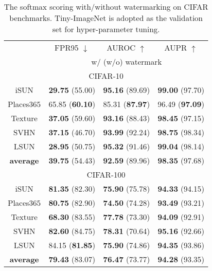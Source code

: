 \documentclass{article}
\begin{document}
\begin{table}[t]
\centering
\caption{The softmax scoring with/without watermarking on CIFAR benchmarks. Tiny-ImageNet is adopted as the validation set for hyper-parameter tuning.} \label{tablast}
\vspace{5pt}
\scriptsize
{
\begin{tabular}{c|ccc}
\toprule[1.5pt]
                   & FPR95 $\downarrow$     & AUROC $\uparrow$       & AUPR $\uparrow$      \\
                   \cline{2-4} 
\multirow{-2}{*}{} & \multicolumn{3}{c}{w/ (w/o) watermark} \\
\midrule[0.6pt]
\multicolumn{4}{c}{\cellcolor{greyL}CIFAR-10} \\
\midrule[0.6pt]
iSUN               & \textbf{29.75} (55.00)& \textbf{95.16} (89.69)& \textbf{99.00} (97.70)\\
Places$365$        & 65.85 (\textbf{60.10})& 85.31 (\textbf{87.97})& 96.49 (\textbf{97.09})\\
Texture            & \textbf{37.05} (59.60)& \textbf{93.16} (88.43)& \textbf{98.45} (97.15)\\
SVHN               & \textbf{37.15} (46.70)& \textbf{93.99} (92.24)& \textbf{98.75} (98.34)\\
LSUN               & \textbf{28.95} (50.75)& \textbf{95.32} (91.46)& \textbf{99.04} (98.14)\\
\midrule
\textbf{average}   & \textbf{39.75} (54.43)& \textbf{92.59} (89.96)& \textbf{98.35} (97.68)\\ \midrule[1pt]
\multicolumn{4}{c}{\cellcolor{greyL}CIFAR-100} \\
\midrule[1pt]
iSUN               & \textbf{81.35} (82.30)& \textbf{75.90} (75.78)& \textbf{94.33} (94.15)\\ 
Places$365$        & \textbf{80.75} (82.90)& \textbf{74.50} (74.28)& \textbf{93.49} (93.21)\\
Texture            & \textbf{68.30} (83.55)& \textbf{77.78} (73.30)& \textbf{94.09} (92.91)\\
SVHN               & \textbf{82.60} (84.75)& \textbf{78.31} (70.64)& \textbf{95.16} (92.66)\\
LSUN               & 84.15 (\textbf{81.85})& \textbf{75.90} (74.86)& \textbf{94.35} (93.86)\\
\midrule
\textbf{average}   & \textbf{79.43} (83.07)  & \textbf{76.47} (73.77)     & \textbf{94.28} (93.35)             \\ \bottomrule[1.5pt]      
\end{tabular}
}
\end{table}
\end{document}
